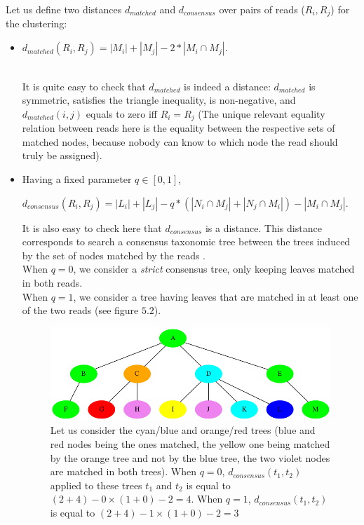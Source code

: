 \documentclass{report}
\begin{document}
Let us define two distances $d_{matched}$ and $d_{consensus}$ over pairs of reads ($R_{i},R_{j}$) for the clustering:
       \begin{itemize} 
       \item \begin{center} $d_{matched}(R_{i},R_{j}) = |M_{i}| + |M_{j}| - 2*|M_{i} \cap M_{j}|$. \end{center}\\ 

It is quite easy to check that $d_{matched}$ is indeed a distance: $d_{matched}$ is symmetric, satisfies the triangle inequality, is non-negative, and $d_{matched}(i,j)$ equals to zero iff $R_{i} = R_{j}$ (The unique relevant equality relation between reads here is the equality between the respective sets of matched nodes, because nobody can know to which node the read should truly be assigned).
       \item Having a fixed parameter $q \in [0,1]$,\\
\begin{center}
$d_{consensus}(R_{i},R_{j}) = |L_{i}| + |L_{j}| - q*(|N_{i}\cap M_{j}| + |N_{j} \cap M_{i}|) - |M_{i} \cap M_{j}|$.\\
\end{center}

It is also easy to check here that $d_{consensus}$ is a distance. This distance corresponds to search a consensus taxonomic tree between the trees induced by the set of nodes matched by the reads \cite{Consensus}.\\

When $q = 0$, we consider a \emph{strict} consensus tree, only keeping leaves matched in both reads.\\
When $q = 1$, we consider a tree having leaves that are matched in at least one of the two reads (see figure $5.2$).

\begin{figure}[H]
\centering
\includegraphics[scale=0.45]{illustrations/distance2.png}
\caption{Let us consider the cyan/blue and orange/red trees (blue and red nodes being the ones matched, the yellow one being matched by the orange tree and not by the blue tree, the two violet nodes are matched in both trees). When $q = 0$, $d_{consensus}(t_{1},t_{2})$ applied to these trees $t_{1}$ and $t_{2}$ is equal to $(2 + 4) - 0 \times (1 + 0) - 2 = 4$. When $q = 1$, $d_{consensus}(t_{1},t_{2})$ is equal to $(2 + 4) - 1 \times (1 + 0) - 2 = 3$}
\end{figure}

       \end{itemize}
\end{document}
